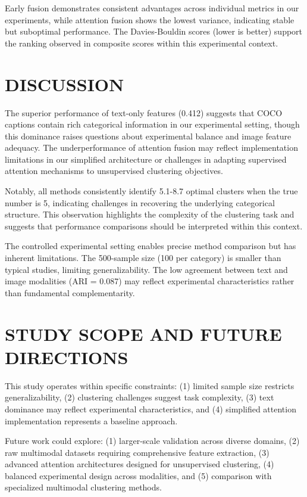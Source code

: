 \documentclass[sigconf]{acmart}
\begin{document}
Early fusion demonstrates consistent advantages across individual metrics in our experiments, while attention fusion shows the lowest variance, indicating stable but suboptimal performance. The Davies-Bouldin scores (lower is better) support the ranking observed in composite scores within this experimental context.

\section{DISCUSSION}

The superior performance of text-only features (0.412) suggests that COCO captions contain rich categorical information in our experimental setting, though this dominance raises questions about experimental balance and image feature adequacy. The underperformance of attention fusion may reflect implementation limitations in our simplified architecture or challenges in adapting supervised attention mechanisms to unsupervised clustering objectives.

Notably, all methods consistently identify 5.1-8.7 optimal clusters when the true number is 5, indicating challenges in recovering the underlying categorical structure. This observation highlights the complexity of the clustering task and suggests that performance comparisons should be interpreted within this context.

The controlled experimental setting enables precise method comparison but has inherent limitations. The 500-sample size (100 per category) is smaller than typical studies, limiting generalizability. The low agreement between text and image modalities (ARI = 0.087) may reflect experimental characteristics rather than fundamental complementarity.

\section{STUDY SCOPE AND FUTURE DIRECTIONS}

This study operates within specific constraints: (1) limited sample size restricts generalizability, (2) clustering challenges suggest task complexity, (3) text dominance may reflect experimental characteristics, and (4) simplified attention implementation represents a baseline approach.

Future work could explore: (1) larger-scale validation across diverse domains, (2) raw multimodal datasets requiring comprehensive feature extraction, (3) advanced attention architectures designed for unsupervised clustering, (4) balanced experimental design across modalities, and (5) comparison with specialized multimodal clustering methods.
\end{document}
